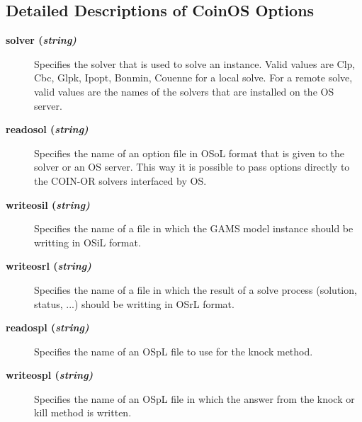 \subsection{Detailed Descriptions of CoinOS Options}

\begin{description}

\item[\label{solver}\hypertarget{solver}
{\textbf{solver (\slshape{string})}}]\hspace{1.0in}

Specifies the solver that is used to solve an instance.
Valid values are Clp, Cbc, Glpk, Ipopt, Bonmin, Couenne for a local solve.
For a remote solve, valid values are the names of the solvers that are installed on the OS server.

\item[\label{readosol}\hypertarget{readosol}
{\textbf{readosol (\slshape{string})}}]\hspace{1.0in}

Specifies the name of an option file in OSoL format that is given to the solver or an OS server.
This way it is possible to pass options directly to the COIN-OR solvers interfaced by OS.

\item[\label{writeosil}\hypertarget{writeosil}
{\textbf{writeosil (\slshape{string})}}]\hspace{1.0in}

Specifies the name of a file in which the GAMS model instance should be writting in OSiL format.


\item[\label{writeosrl}\hypertarget{writeosrl}
{\textbf{writeosrl (\slshape{string})}}]\hspace{1.0in}

Specifies the name of a file in which the result of a solve process (solution, status, ...) should be writting in OSrL format.

\item[\label{readospl}\hypertarget{readospl}
{\textbf{readospl (\slshape{string})}}]\hspace{1.0in}

Specifies the name of an OSpL file to use for the knock method.


\item[\label{writeospl}\hypertarget{writeospl}
{\textbf{writeospl (\slshape{string})}}]\hspace{1.0in}

Specifies the name of an OSpL file in which the answer from the knock or kill method is written.



\end{description}
